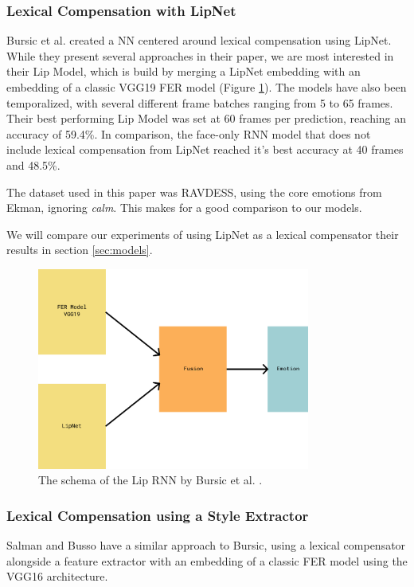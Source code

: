 \subsubsection{Lexical Compensation with LipNet}
\label{sub:lip}
Bursic et al. \cite{bursic2020improving} created a NN centered around lexical compensation using LipNet. While they present several approaches in their paper, we are most interested in their Lip Model, which is build by merging a LipNet embedding with an embedding of a classic VGG19 FER model (Figure \ref{fig:bursic_schema}). The models have also been temporalized, with several different frame batches ranging from 5 to 65 frames. Their best performing Lip Model was set at 60 frames per prediction, reaching an accuracy of 59.4\%. In comparison, the face-only RNN model that does not include lexical compensation from LipNet reached it's best accuracy at 40 frames and 48.5\%.

The dataset used in this paper was RAVDESS, using the core emotions from Ekman, ignoring \emph{calm}. This makes for a good comparison to our models.

We will compare our experiments of using LipNet as a lexical compensator their results in section \ref{sec:models}.

\begin{figure}
    \centering
    \includegraphics[width=0.8\textwidth]{res/lipnetpng.png}
    \caption{The schema of the Lip RNN by Bursic et al. \cite{bursic2020improving}.}
    \label{fig:bursic_schema}
\end{figure}

\subsubsection{Lexical Compensation using a Style Extractor}
\label{sub:style}
Salman and Busso \cite{salman2020style} have a similar approach to Bursic, using a lexical compensator alongside a feature extractor with an embedding of a classic FER model using the VGG16 architecture.

